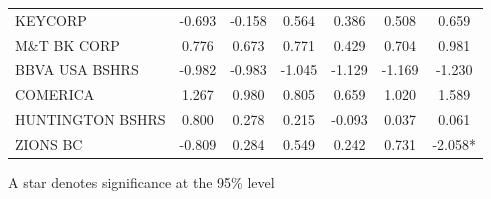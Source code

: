 \documentclass[11pt]{article}
\begin{document}
\begin{table}
\begin{tabular}{|l|c|c|c|c|c|c|}
KEYCORP               &-0.693&-0.158&0.564&0.386&0.508&0.659\\      
M\&T BK CORP          &0.776&0.673&0.771&0.429&0.704&0.981\\        
BBVA USA BSHRS        &-0.982&-0.983&-1.045&-1.129&-1.169&-1.230\\  
COMERICA              &1.267&0.980&0.805&0.659&1.020&1.589\\        
HUNTINGTON BSHRS      &0.800&0.278&0.215&-0.093&0.037&0.061\\       
ZIONS BC              &-0.809&0.284&0.549&0.242&0.731&-2.058*\\     
\hline                                                              
\end{tabular} 

\flushleft
\footnotesize \noindent A star denotes significance at the 95\% level                                                      
                                                      
\end{table}                                                         
\end{document}
